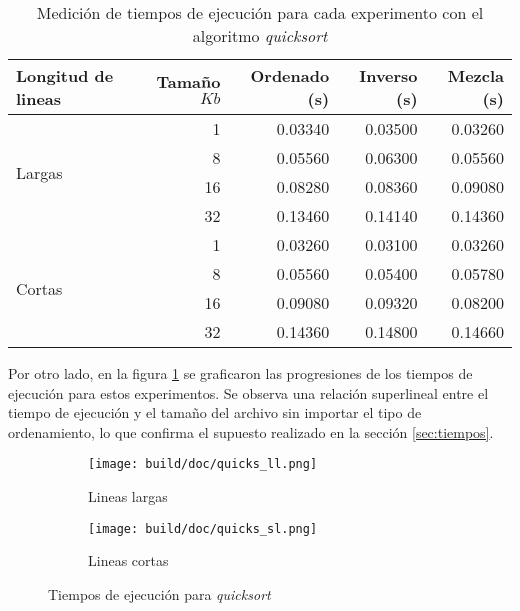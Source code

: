 \documentclass[a4paper,11pt]{article}
\begin{document}
\begin{table}[h!t]
\centering
\begin{tabular}{ | l | r | r | r |r | }
  \hline
  Longitud de lineas           & Tamaño \(Kb\) & Ordenado (s) & Inverso (s) & Mezcla (s) \\ \hline
   \multirow{4}{*}{Largas}     & 1             & 0.03340      & 0.03500     & 0.03260 \\
                               & 8             & 0.05560      & 0.06300     & 0.05560 \\
                               & 16            & 0.08280      & 0.08360     & 0.09080 \\
                               & 32            & 0.13460      & 0.14140     & 0.14360 \\ \hline
  \multirow{4}{*}{Cortas}      & 1             & 0.03260      & 0.03100     & 0.03260 \\
                               & 8             & 0.05560      & 0.05400     & 0.05780 \\
                               & 16            & 0.09080      & 0.09320     & 0.08200 \\
                               & 32            & 0.14360      & 0.14800     & 0.14660 \\
  \hline
\end{tabular}
\caption{Medición de tiempos de ejecución para cada experimento con el algoritmo \textit{quicksort}}
\label{tab:medicionesquick}
\end{table}

Por otro lado, en la figura \ref{fig:medicionesquick} se graficaron las
progresiones de los tiempos de ejecución para estos experimentos. Se observa
una relación superlineal entre el tiempo de ejecución y el tamaño del archivo
sin importar el tipo de ordenamiento, lo que confirma el supuesto realizado en
la sección \ref{sec:tiempos}.

\begin{figure}
  \begin{subfigure}[b]{\textwidth}
    \centering
    \texttt{[image: build/doc/quicks\_ll.png]}
    \caption{Lineas largas}
  \end{subfigure}%

  \begin{subfigure}[b]{\textwidth}
    \centering
    \texttt{[image: build/doc/quicks\_sl.png]}
    \caption{Lineas cortas}
  \end{subfigure}
  \caption{Tiempos de ejecución para \textit{quicksort}}\label{fig:medicionesquick}
\end{figure}
\end{document}
